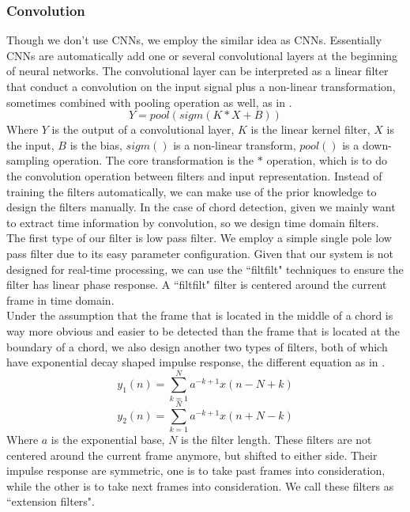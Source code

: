 \documentclass{article}
\begin{document}
\subsubsection{Convolution}
Though we don't use CNNs, we employ the similar idea as CNNs. Essentially CNNs are automatically add one or several convolutional layers at the beginning of neural networks. The convolutional layer can be interpreted as a linear filter that conduct a convolution on the input signal plus a non-linear transformation, sometimes combined with pooling operation as well, as in .
\begin{equation}\label{Covulution}
Y = pool(sigm(K \ast X + B))
\end{equation}  
Where $Y$ is the output of a convolutional layer, $K$ is the linear kernel filter, $X$ is the input, $B$ is the bias, $sigm()$ is a non-linear transform, $pool()$ is a down-sampling operation. The core transformation is the $\ast$ operation, which is to do the convolution operation between filters and input representation. 
Instead of training the filters automatically, we can make use of the prior knowledge to design the filters manually. In the case of chord detection, given we mainly want to extract time information by convolution, so we design time domain filters. \\
The first type of our filter is low pass filter. We employ a simple single pole low pass filter due to its easy parameter configuration. Given that our system is not designed for real-time processing, we can use the ``filtfilt" techniques to ensure the filter has linear phase response. A ``filtfilt" filter is centered around the current frame in time domain. \\
Under the assumption that the frame that is located in the middle of a chord is way more obvious and easier to be detected than the frame that is located at the boundary of a chord, we also design another two types of filters, both of which have exponential decay shaped impulse response, the different equation as in  . 
\begin{equation}\label{filter1}
y_{1}(n) = \sum_{k=1}^N a^{-k+1} x(n-N+k)
\end{equation}
\begin{equation}\label{filter2}
y_{2}(n) = \sum_{k=1}^N a^{-k+1} x(n+N-k)
\end{equation} 
Where $a$ is the exponential base, $N$ is the filter length. 
These filters are not centered around the current frame anymore, but shifted to either side. Their impulse response are symmetric, one is to take past frames into consideration, while the other is to take next frames into consideration. We call these filters as ``extension filters".  \\
\end{document}
